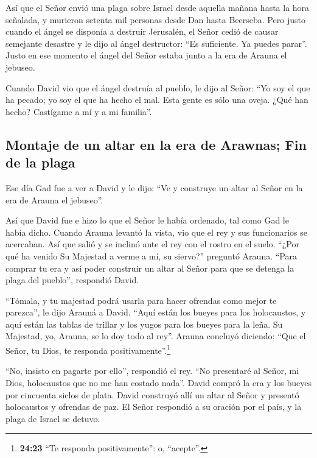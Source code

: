  Así que el Señor envió una plaga sobre Israel desde
aquella mañana hasta la hora señalada, y murieron setenta mil personas
desde Dan hasta Beerseba.  Pero justo cuando el ángel se
disponía a destruir Jerusalén, el Señor cedió de causar semejante
desastre y le dijo al ángel destructor: ``Es suficiente. Ya puedes
parar''. Justo en ese momento el ángel del Señor estaba junto a la era
de Arauna el jebuseo.

 Cuando David vio que el ángel destruía al pueblo, le
dijo al Señor: ``Yo soy el que ha pecado; yo soy el que ha hecho el mal.
Esta gente es sólo una oveja. ¿Qué han hecho? Castígame a mí y a mi
familia''.

\hypertarget{montaje-de-un-altar-en-la-era-de-arawnas-fin-de-la-plaga}{%
\subsection{Montaje de un altar en la era de Arawnas; Fin de la
plaga}\label{montaje-de-un-altar-en-la-era-de-arawnas-fin-de-la-plaga}}

 Ese día Gad fue a ver a David y le dijo: ``Ve y
construye un altar al Señor en la era de Arauna el jebuseo''.

 Así que David fue e hizo lo que el Señor le había
ordenado, tal como Gad le había dicho.  Cuando Arauna
levantó la vista, vio que el rey y sus funcionarios se acercaban. Así
que salió y se inclinó ante el rey con el rostro en el suelo.
 ``¿Por qué ha venido Su Majestad a verme a mí, su
siervo?'' preguntó Arauna. ``Para comprar tu era y así poder construir
un altar al Señor para que se detenga la plaga del pueblo'', respondió
David.

 ``Tómala, y tu majestad podrá usarla para hacer ofrendas
como mejor te parezca'', le dijo Arauná a David. ``Aquí están los bueyes
para los holocaustos, y aquí están las tablas de trillar y los yugos
para los bueyes para la leña.  Su Majestad, yo, Arauna,
se lo doy todo al rey''. Arauna concluyó diciendo: ``Que el Señor, tu
Dios, te responda positivamente''.\footnote{\textbf{24:23} ``Te responda
  positivamente'': o, ``acepte''.}

 ``No, insisto en pagarte por ello'', respondió el rey.
``No presentaré al Señor, mi Dios, holocaustos que no me han costado
nada''. David compró la era y los bueyes por cincuenta siclos de plata.
 David construyó allí un altar al Señor y presentó
holocaustos y ofrendas de paz. El Señor respondió a su oración por el
país, y la plaga de Israel se detuvo.
